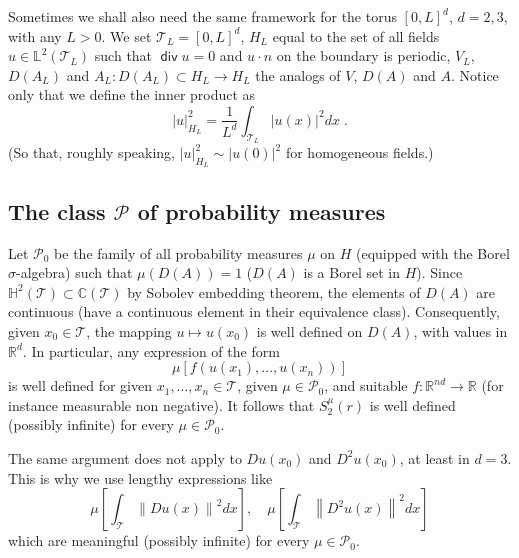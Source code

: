 \documentclass[11pt]{preprint}
\DeclareMathOperator{\Div}{\mathsf{div}}
\begin{document}
Sometimes we shall also need the same framework for the torus $\left[
0,L\right]  ^{d}$, $d=2,3$, with any $L>0$. We set $\mathcal{T}_{L}=\left[
0,L\right]  ^{d}$, $H_{L}$ equal to the set of all fields $u\in\mathbb{L}%
^{2}\left(  \mathcal{T}_{L}\right)  $ such that $\Div u=0$ and $u\cdot
n $ on the boundary is periodic, $V_{L}$, $D\left(  A_{L}\right)  $ and
$A_{L}:D\left(  A_{L}\right)  \subset H_{L}\rightarrow H_{L}$ the analogs of
$V$, $D\left(  A\right)  $ and $A$. Notice only that we define the inner
product as
\[
\left|  u\right|  _{H_{L}}^{2}=\frac{1}{L^{d}}\int_{\mathcal{T}_{L}}\left|
u\left(  x\right)  \right|  ^{2}dx\;.
\]
(So that, roughly speaking, $\left|  u\right|  _{H_{L}}^{2}\sim\left|
u\left(  0\right)  \right|  ^{2}$ for homogeneous fields.)

\subsection{The class $\mathcal{P}$ of probability measures}

Let $\mathcal{P}_{0}$ be the family of all probability measures $\mu$ on $H$
(equipped with the Borel $\sigma$-algebra) such that $\mu\left(  D(A)\right)  =1$
($D(A)$ is a Borel set in $H$). Since $\mathbb{H}^{2}\left(  \mathcal{T}%
\right)  \subset\mathbb{C}\left(  \mathcal{T}\right)  $ by Sobolev embedding
theorem, the elements of $D(A)$ are continuous (have a continuous element in
their equivalence class). Consequently, given $x_{0}\in\mathcal{T}$, the
mapping $u\mapsto u\left(  x_{0}\right)  $ is well defined on $D(A)$, with
values in $\mathbb{R}^{d}$. In particular, any expression of the form
\[
\mu\left[  f\left(  u\left(  x_{1}\right)  ,...,u\left(  x_{n}\right)
\right)  \right]
\]
is well defined for given $x_{1},...,x_{n}\in\mathcal{T}$, given $\mu
\in\mathcal{P}_{0}$, and suitable $f:\mathbb{R}^{nd}\rightarrow\mathbb{R}$
(for instance measurable non negative). It follows that $S_{2}^{\mu}\left(
r\right)  $ is well defined (possibly infinite) for every $\mu\in
\mathcal{P}_{0}$.

The same argument does not apply to $Du\left(  x_{0}\right)  $ and
$D^{2}u\left(  x_{0}\right)  $, at least in $d=3$. This is why we use lengthy
expressions like
\[
\mu\left[  \int_{\mathcal{T}}\left\|  Du\left(  x\right)  \right\|
^{2}dx\right]  ,\quad\mu\left[  \int_{\mathcal{T}}\left\|  D^{2}u\left(
x\right)  \right\|  ^{2}dx\right]
\]
which are meaningful (possibly infinite) for every $\mu\in\mathcal{P}_{0}$.
\end{document}
